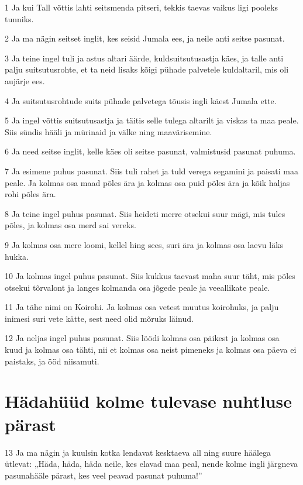 \par 1 Ja kui Tall võttis lahti seitsmenda pitseri, tekkis taevas vaikus ligi pooleks tunniks.
\par 2 Ja ma nägin seitset inglit, kes seisid Jumala ees, ja neile anti seitse pasunat.
\par 3 Ja teine ingel tuli ja astus altari äärde, kuldsuitsutusastja käes, ja talle anti palju suitsutusrohte, et ta neid lisaks kõigi pühade palvetele kuldaltaril, mis oli aujärje ees.
\par 4 Ja suitsutusrohtude suits pühade palvetega tõusis ingli käest Jumala ette.
\par 5 Ja ingel võttis suitsutusastja ja täitis selle tulega altarilt ja viskas ta maa peale. Siis sündis hääli ja mürinaid ja välke ning maavärisemine.
\par 6 Ja need seitse inglit, kelle käes oli seitse pasunat, valmistusid pasunat puhuma.
\par 7 Ja esimene puhus pasunat. Siis tuli rahet ja tuld verega segamini ja paisati maa peale. Ja kolmas osa maad põles ära ja kolmas osa puid põles ära ja kõik haljas rohi põles ära.
\par 8 Ja teine ingel puhus pasunat. Siis heideti merre otsekui suur mägi, mis tules põles, ja kolmas osa merd sai vereks.
\par 9 Ja kolmas osa mere loomi, kellel hing sees, suri ära ja kolmas osa laevu läks hukka.
\par 10 Ja kolmas ingel puhus pasunat. Siis kukkus taevast maha suur täht, mis põles otsekui tõrvalont ja langes kolmanda osa jõgede peale ja veeallikate peale.
\par 11 Ja tähe nimi on Koirohi. Ja kolmas osa vetest muutus koirohuks, ja palju inimesi suri vete kätte, sest need olid mõruks läinud.
\par 12 Ja neljas ingel puhus pasunat. Siis löödi kolmas osa päikest ja kolmas osa kuud ja kolmas osa tähti, nii et kolmas osa neist pimeneks ja kolmas osa päeva ei paistaks, ja ööd niisamuti.

\section*{Hädahüüd kolme tulevase nuhtluse pärast}

\par 13 Ja ma nägin ja kuulsin kotka lendavat kesktaeva all ning suure häälega ütlevat: „Häda, häda, häda neile, kes elavad maa peal, nende kolme ingli järgneva pasunahääle pärast, kes veel peavad pasunat puhuma!”


